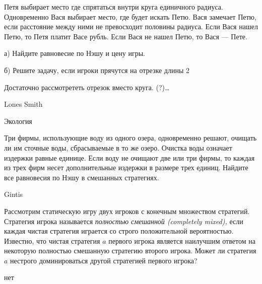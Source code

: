 \begin{problem}

Петя выбирает место где спрятаться внутри круга единичного радиуса. Одновременно Вася выбирает место, где будет искать Петю. Вася замечает Петю, если расстояние между ними не превосходит половины радиуса. Если Вася нашел Петю, то Петя платит Васе рубль. Если Вася не нашел Петю, то Вася — Пете. \par
а) Найдите равновесие по Нэшу и цену игры. \par
б) Решите задачу, если игроки прячутся на отрезке длины 2



\begin{sol}

Достаточно рассмотрететь отрезок вместо круга. (?)\ldots
\end{sol}
\end{problem}


\begin{source}
 Lones Smith
\end{source}



\begin{problem}
 Экология \par
Три фирмы, использующие воду из одного озера, одновременно решают, очищать ли им сточные воды, сбрасываемые в то же озеро. Очистка воды означает издержки равные единице. Если воду не очищают две или три фирмы, то каждая из трех фирм несет дополнительные издержки в размере трех единиц.
Найдите все равновесия по Нэшу в смешанных стратегиях.



\begin{sol}

\end{sol}
\end{problem}


\begin{source}
Gintis
\end{source}



\begin{problem}
 Рассмотрим статическую игру двух игроков с конечным множеством стратегий. Стратегия игрока называется {\it полностью смешанной (completely mixed),} если каждая чистая стратегия играется со строго положительной вероятностью. Известно, что чистая стратегия  $a$  первого игрока является наилучшим ответом на некоторую полностью смешанную стратегию второго игрока.
Может ли стратегия  $a$  нестрого доминироваться другой стратегией первого игрока?




\begin{sol}
нет
\end{sol}
\end{problem}



